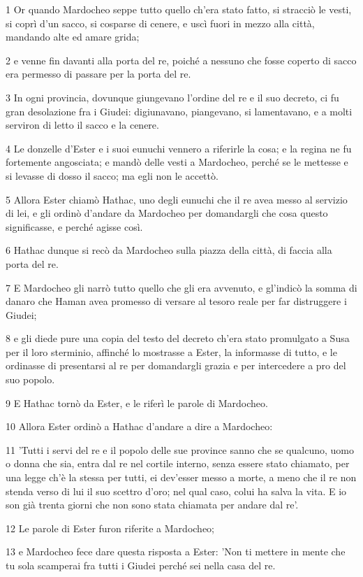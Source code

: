 \par 1 Or quando Mardocheo seppe tutto quello ch'era stato fatto, si stracciò le vesti, si coprì d'un sacco, si cosparse di cenere, e uscì fuori in mezzo alla città, mandando alte ed amare grida;
\par 2 e venne fin davanti alla porta del re, poiché a nessuno che fosse coperto di sacco era permesso di passare per la porta del re.
\par 3 In ogni provincia, dovunque giungevano l'ordine del re e il suo decreto, ci fu gran desolazione fra i Giudei: digiunavano, piangevano, si lamentavano, e a molti serviron di letto il sacco e la cenere.
\par 4 Le donzelle d'Ester e i suoi eunuchi vennero a riferirle la cosa; e la regina ne fu fortemente angosciata; e mandò delle vesti a Mardocheo, perché se le mettesse e si levasse di dosso il sacco; ma egli non le accettò.
\par 5 Allora Ester chiamò Hathac, uno degli eunuchi che il re avea messo al servizio di lei, e gli ordinò d'andare da Mardocheo per domandargli che cosa questo significasse, e perché agisse così.
\par 6 Hathac dunque si recò da Mardocheo sulla piazza della città, di faccia alla porta del re.
\par 7 E Mardocheo gli narrò tutto quello che gli era avvenuto, e gl'indicò la somma di danaro che Haman avea promesso di versare al tesoro reale per far distruggere i Giudei;
\par 8 e gli diede pure una copia del testo del decreto ch'era stato promulgato a Susa per il loro sterminio, affinché lo mostrasse a Ester, la informasse di tutto, e le ordinasse di presentarsi al re per domandargli grazia e per intercedere a pro del suo popolo.
\par 9 E Hathac tornò da Ester, e le riferì le parole di Mardocheo.
\par 10 Allora Ester ordinò a Hathac d'andare a dire a Mardocheo:
\par 11 'Tutti i servi del re e il popolo delle sue province sanno che se qualcuno, uomo o donna che sia, entra dal re nel cortile interno, senza essere stato chiamato, per una legge ch'è la stessa per tutti, ei dev'esser messo a morte, a meno che il re non stenda verso di lui il suo scettro d'oro; nel qual caso, colui ha salva la vita. E io son già trenta giorni che non sono stata chiamata per andare dal re'.
\par 12 Le parole di Ester furon riferite a Mardocheo;
\par 13 e Mardocheo fece dare questa risposta a Ester: 'Non ti mettere in mente che tu sola scamperai fra tutti i Giudei perché sei nella casa del re.
